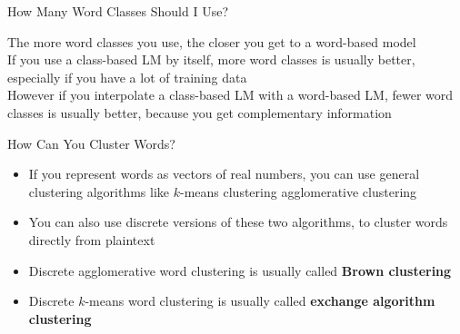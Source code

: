 \documentclass[xcolor=pdftex,x11names,table,hyperref]{beamer}
\begin{document}
\begin{frame}{How Many Word Classes Should I Use?}
	\begin{large}
	The more word classes you use, the closer you get to a word-based model \\[1.0em]

	\pause
	If you use a class-based LM by itself, more word classes is usually better, especially if you have a lot of training data \\[1.0em]

	\pause
	However if you interpolate a class-based LM with a word-based LM, fewer word classes is usually better, because you get complementary information
	\end{large}
\end{frame}

\begin{frame}{How Can You Cluster Words?}
\begin{itemize}
	\item If you represent words as vectors of real numbers, you can use general clustering algorithms like $k$-means clustering agglomerative clustering
	\pause
	\item You can also use discrete versions of these two algorithms, to cluster words directly from plaintext
	\pause
	\item Discrete agglomerative word clustering is usually called \textbf{Brown clustering}
	\item Discrete $k$-means word clustering is usually called \textbf{exchange algorithm clustering}
\end{itemize}
\end{frame}

\begin{frame}{}
	\hspace*{-19.0em}%
	\scalebox{0.77}{%
		
	}%
\end{frame}
\end{document}
